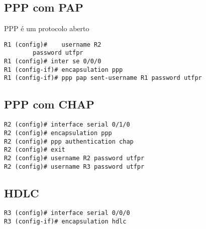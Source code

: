 \documentclass[]{article}
\begin{document}
\hypertarget{ppp-com-pap}{%
\subsection{PPP com PAP}\label{ppp-com-pap}}

PPP é um protocolo aberto

\begin{verbatim}
R1 (config)#    username R2
        password utfpr
R1 (config)# inter se 0/0/0
R1 (config-if)# encapsulation ppp
R1 (config-if)# ppp pap sent-username R1 password utfpr
\end{verbatim}

\hypertarget{ppp-com-chap}{%
\subsection{PPP com CHAP}\label{ppp-com-chap}}

\begin{verbatim}
R2 (config)# interface serial 0/1/0
R2 (config)# encapsulation ppp
R2 (config)# ppp authentication chap
R2 (config)# exit
R2 (config)# username R2 password utfpr
R2 (config)# username R3 password utfpr
\end{verbatim}

\hypertarget{hdlc}{%
\subsection{HDLC}\label{hdlc}}

\begin{verbatim}
R3 (config)# interface serial 0/0/0
R3 (config-if)# encapsulation hdlc
\end{verbatim}
\end{document}
